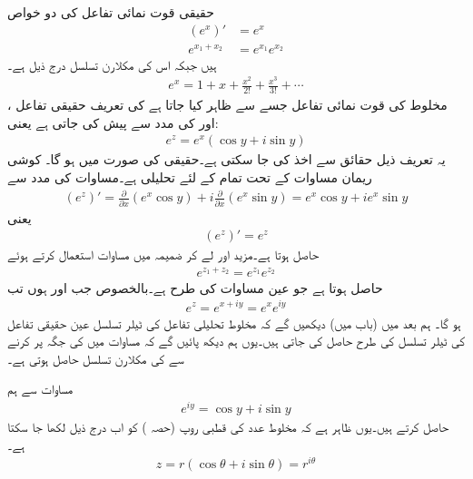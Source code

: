 حقیقی قوت نمائی تفاعل  کی دو خواص
\begin{align}
(e^x)'&=e^x\label{مساوات_مخلوط_قوت_نمائی_حقیقی_الف}\\
e^{x_1+x_2}&=e^{x_1}e^{x_2}\label{مساوات_مخلوط_قوت_نمائی_حقیقی_ب}
\end{align}
ہیں جبکہ اس کی مکلارن تسلسل درج ذیل ہے۔
\begin{align}
e^x=1+x+\frac{x^2}{2!}+\frac{x^3}{3!}+\cdots\label{مساوات_مخلوط_قوت_نمائی_حقیقی_پ}
\end{align}
مخلوط  کی قوت نمائی تفاعل جسے  سے ظاہر کیا جاتا ہے کی تعریف حقیقی تفاعل ،  اور  کی مدد سے پیش کی جاتی ہے یعنی:
\begin{align}\label{مساوات_مخلوط_قوت_نمائی_تعریف_الف}
e^z=e^x(\cos y+i\sin y)
\end{align} 
یہ تعریف ذیل حقائق سے اخذ کی جا سکتی ہے۔حقیقی  کی صورت میں  ہو گا۔ کوشی ریمان مساوات کے تحت  تمام  کے لئے تحلیلی ہے۔مساوات  کی مدد سے
\begin{align*}
(e^z)'=\frac{\partial}{\partial x}(e^x\cos y)+i\frac{\partial}{\partial x}(e^x\sin y)=e^x\cos y+ie^x\sin y
\end{align*}
یعنی
\begin{align}\label{مساوات_مخلوط_قوت_نمائی_تعریف_ب}
(e^z)'=e^z
\end{align}
حاصل ہوتا ہے۔مزید  اور  لے کر  ضمیمہ  میں مساوات  استعمال کرتے ہوئے
\begin{align}\label{مساوات_مخلوط_قوت_نمائی_تعریف_پ}
e^{z_1+z_2}=e^{z_1}e^{z_2}
\end{align}
حاصل ہوتا ہے جو عین مساوات  کی طرح ہے۔بالخصوص جب  اور  ہوں تب
\begin{align}\label{مساوات_مخلوط_قوت_نمائی_تعریف_ت}
e^z=e^{x+iy}=e^xe^{iy}
\end{align}
ہو گا۔ ہم بعد میں (باب  میں)  دیکھیں گے کہ مخلوط تحلیلی تفاعل کی ٹیلر تسلسل عین حقیقی تفاعل کی ٹیلر تسلسل کی طرح حاصل کی جاتی ہیں۔یوں ہم دیکھ پائیں گے کہ مساوات  میں  کی جگہ  پر کرنے سے  کی مکلارن تسلسل حاصل ہوتی ہے۔

مساوات  سے ہم 
\begin{align}\label{مساوات_مخلوط_قوت_نمائی_تعریف_ٹ}
e^{iy}=\cos y+i\sin y
\end{align} 
حاصل کرتے ہیں۔یوں ظاہر  ہے کہ مخلوط عدد  کی قطبی روپ (حصہ ) کو اب درج ذیل لکھا جا سکتا ہے۔
\begin{align}\label{مساوات_مخلوط_قوت_نمائی_تعریف_ث}
z=r(\cos \theta+i\sin \theta)=r^{i\theta}
\end{align}

